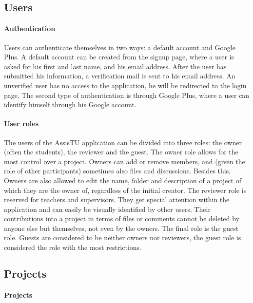 \subsection*{Users}

\paragraph{Authentication}

Users can authenticate themselves in two ways: a default account and Google Plus. A default account can be created from the signup page, where a 
user is asked for his first and last name, and his email address. After the user has submitted his information, a verification mail is sent to his email address. An unverified user has no access to the application, he will be redirected to the login page. The second type of authentication is through
Google Plus, where a user can identify himself through his Google account.

\paragraph{User roles}

The users of the AssisTU application can be divided into three roles: the owner (often the students), the reviewer and the guest. The owner role allows for the most control over a project. 
Owners can add or remove members, and (given the role of other participants) sometimes also files and discussions. Besides this, Owners are also allowed to edit the name, folder and description of a project of which they are the owner of, regardless of the initial creator. 
The reviewer role is reserved for teachers and supervisors. They get special attention within the application and can easily be visually identified by other users. Their contributions into a project in terms of files or comments cannot be deleted by anyone else but themselves, not even by the owners. 
The final role is the guest role. Guests are considered to be neither owners nor reviewers, the guest role is considered the role with the most restrictions.

\subsection*{Projects}

\paragraph{Projects}

